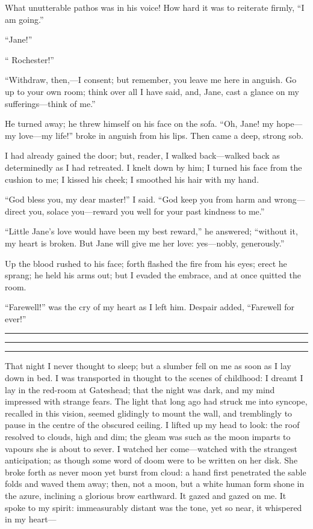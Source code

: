 What unutterable pathos was in his voice! How hard it was to reiterate
firmly, \enquote{I am going.}

\enquote{Jane!}

\enquote{\Mr{} Rochester!}

\enquote{Withdraw, then,---I consent; but remember, you leave me here in
	anguish. Go up to your own room; think over all I have said, and, Jane,
	cast a glance on my sufferings---think of me.}

He turned away; he threw himself on his face on the sofa. \enquote{Oh,
	Jane! my hope---my love---my life!} broke in anguish from his lips.
Then came a deep, strong sob.

I had already gained the door; but, reader, I walked back---walked back
as determinedly as I had retreated. I knelt down by him; I turned his
face from the cushion to me; I kissed his cheek; I smoothed his hair
with my hand.

\enquote{God bless you, my dear master!} I said. \enquote{God keep you
	from harm and wrong---direct you, solace you---reward you well for your
	past kindness to me.}

\enquote{Little Jane's love would have been my best reward,} he
answered; \enquote{without it, my heart is broken. But Jane will give
	me her love: yes---nobly, generously.}

Up the blood rushed to his face; forth flashed the fire from his eyes;
erect he sprang; he held his arms out; but I evaded the embrace, and at
once quitted the room.

\enquote{Farewell!} was the cry of my heart as I left him. Despair
added, \enquote{Farewell for ever!}

\plainbreak{1}
\fancybreak{\texttt{[image: symbols/divider.pdf]}} %
\plainbreak{1}

That night I never thought to sleep; but a slumber fell on me as soon as
I lay down in bed. I was transported in thought to the scenes of
childhood: I dreamt I lay in the red-room at Gateshead; that the night
was dark, and my mind impressed with strange fears. The light that long
ago had struck me into syncope, recalled in this vision, seemed
glidingly to mount the wall, and tremblingly to pause in the centre of
the obscured ceiling. I lifted up my head to look: the roof resolved to
clouds, high and dim; the gleam was such as the moon imparts to vapours
she is about to sever. I watched her come---watched with the strangest
anticipation; as though some word of doom were to be written on her
disk. She broke forth as never moon yet burst from cloud: a hand first
penetrated the sable folds and waved them away; then, not a moon, but a
white human form shone in the azure, inclining a glorious brow
earthward. It gazed and gazed on me. It spoke to my spirit:
immeasurably distant was the tone, yet so near, it whispered in my
heart---

